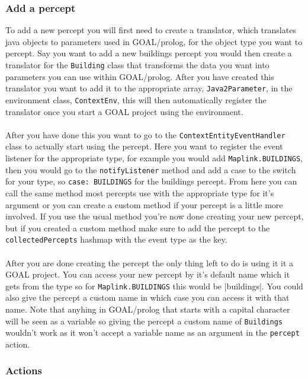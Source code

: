 \subsubsection{Add a percept}
To add a new percept you will first need to create a translator, which translates java objects to parameters used in GOAL/prolog, for the object type you want to percept. Say you want to add a new buildings percept you would then create a translator for the \verb|Building| class that transforms the data you want into parameters you can use within GOAL/prolog.
After you have created this translator you want to add it to the appropriate array, \verb|Java2Parameter|, in the environment class, \verb|ContextEnv|, this will then automatically register the translator once you start a GOAL project using the environment.\\
\\
After you have done this you want to go to the \verb|ContextEntityEventHandler| class to actually start using the percept.
Here you want to register the event listener for the appropriate type, for example you would add \verb|Maplink.BUILDINGS|, then you would go to the \verb|notifyListener| method and add a case to the switch for your type, so \verb|case: BUILDINGS| for the buildings percept.
From here you can call the same method most percepts use with the appropriate type for it's argument or you can create a custom method if your percept is a little more involved.
If you use the usual method you're now done creating your new percept, but if you created a custom method make sure to add the percept to the \verb|collectedPercepts| hashmap with the event type as the key.\\
\\
After you are done creating the percept the only thing left to do is using it it a GOAL project. You can access your new percept by it's default name which it gets from the type so for \verb|Maplink.BUILDINGS| this would be |buildings|. You could also give the percept a custom name in which case you can access it with that name. Note that anyhing in GOAL/prolog that starts with a capital character will be seen as a variable so giving the percept a custom name of \verb|Buildings| wouldn't work as it won't accept a variable name as an argument in the \verb|percept| action.

\subsubsection{Actions}

